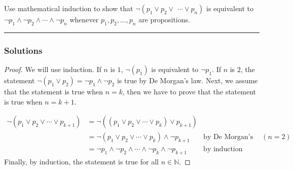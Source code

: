 \newpage
\begin{question}
Use mathematical induction to show that $\neg\left(p_1 \vee p_2 \vee\right.$ $\left.\cdots \vee p_n\right)$ is equivalent to $\neg p_1 \wedge \neg p_2 \wedge \cdots \wedge \neg p_n$ whenever $p_1, p_2, \ldots, p_n$ are propositions.

\end{question}

\par\noindent\rule{\textwidth}{0.5pt}

\subsubsection*{Solutions}

\begin{proof}
    We will use induction. If $n$ is $1$, $\neg (p_1)$ is equivalent to $\neg p_1$. If $n$ is $2$, the statement $\neg (p_1 \vee p_2) = \neg p_1 \wedge \neg p_2$ is true by De Morgan's law. Next, we assume that the statement is true when $n = k$, then we have to prove that the statement is true when $n = k+1$.

    \begin{align*}
        \neg \left(p_1 \vee p_2 \vee \cdots \vee p_{k+1} \right)
        &= \neg \left(\left( p_1 \vee p_2 \vee \cdots \vee p_{k} \right) \vee p_{k+1} \right) \\
        &= \neg \left( p_1 \vee p_2 \vee \cdots \vee p_k \right) \wedge \neg p_{k+1} & \text{by De Morgan's law} (n = 2)\\
        &= \neg p_1 \wedge \neg p_2 \wedge \cdots \wedge \neg p_k \wedge \neg p_{k+1} & \text{by induction hypothesis}
    \end{align*}
    Finally, by induction, the statement is true for all $n \in \mathbb{N}$.
\end{proof}